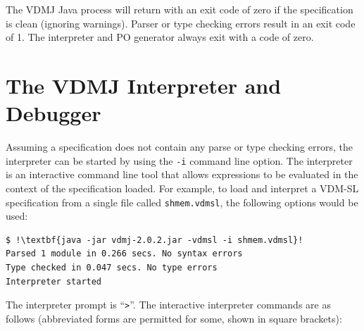\documentclass{overturerepchap}
\begin{document}
The VDMJ Java process will return with an exit code of zero if the
specification is clean (ignoring warnings). Parser or type checking
errors result in an exit code of 1. The interpreter and PO generator
always exit with a code of zero.

\section{The VDMJ Interpreter and Debugger}\label{sec:commandlineinterpreter}

Assuming a specification does not contain any parse or type checking errors, the interpreter can be
started by using the \texttt{-i} command line option.
The interpreter is an interactive command line tool that allows expressions to be evaluated in the
context of the specification loaded. For example, to load and interpret a
VDM-SL specification from a single file called \texttt{shmem.vdmsl},
the following options would be used:

\begin{lstlisting}
$ !\textbf{java -jar vdmj-2.0.2.jar -vdmsl -i shmem.vdmsl}!
Parsed 1 module in 0.266 secs. No syntax errors
Type checked in 0.047 secs. No type errors
Interpreter started
\end{lstlisting}

The interpreter prompt is ``\texttt{>}''. The 
interactive interpreter commands are as follows (abbreviated forms are
permitted for some, shown in square brackets): 
\end{document}
